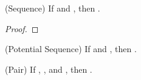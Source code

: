 \begin{lemma}\textnormal{(Sequence)}\label{lemma:seq}
If  and 
, then 
.
\end{lemma}

\begin{proof}

\end{proof}

\begin{corollary}\textnormal{(Potential Sequence)}\label{cor:potseq}
If \isPot{\varphi} and
, then 
.
\end{corollary}

\begin{lemma}\textnormal{(Pair)}\label{lemma:pair}
If , , and ,
then . 
\end{lemma}


